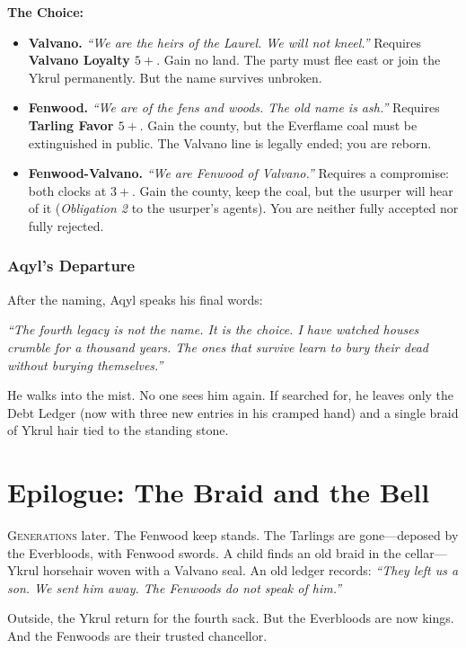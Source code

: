 \documentclass[11pt,a5paper]{book}
\newcommand{\condition}[1]{\textit{#1}}
\begin{document}
\textbf{The Choice:}
\begin{itemize}[leftmargin=*]
\item \textbf{Valvano.} \textit{``We are the heirs of the Laurel. We will not kneel.''} Requires \textbf{Valvano Loyalty $5+$}. Gain no land. The party must flee east or join the Ykrul permanently. But the name survives unbroken.
\item \textbf{Fenwood.} \textit{``We are of the fens and woods. The old name is ash.''} Requires \textbf{Tarling Favor $5+$}. Gain the county, but the Everflame coal must be extinguished in public. The Valvano line is legally ended; you are reborn.
\item \textbf{Fenwood-Valvano.} \textit{``We are Fenwood of Valvano.''} Requires a compromise: both clocks at $3+$. Gain the county, keep the coal, but the usurper will hear of it (\condition{Obligation 2} to the usurper's agents). You are neither fully accepted nor fully rejected.
\end{itemize}

\subsection*{Aqyl's Departure}

After the naming, Aqyl speaks his final words:

\emph{``The fourth legacy is not the name. It is the choice. I have watched houses crumble for a thousand years. The ones that survive learn to bury their dead without burying themselves.''}

He walks into the mist. No one sees him again. If searched for, he leaves only the Debt Ledger (now with three new entries in his cramped hand) and a single braid of Ykrul hair tied to the standing stone.

\clearpage

\chapter*{Epilogue: The Braid and the Bell}

\lettrine{G}{enerations} later. The Fenwood keep stands. The Tarlings are gone---deposed by the Everbloods, with Fenwood swords. A child finds an old braid in the cellar---Ykrul horsehair woven with a Valvano seal. An old ledger records: \textit{``They left us a son. We sent him away. The Fenwoods do not speak of him.''}

Outside, the Ykrul return for the fourth sack. But the Everbloods are now kings. And the Fenwoods are their trusted chancellor.
\end{document}
